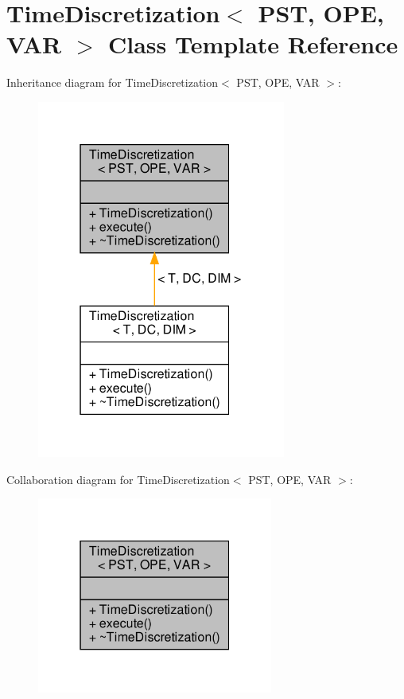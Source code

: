 \hypertarget{classTimeDiscretization}{}\section{Time\+Discretization$<$ P\+ST, O\+PE, V\+AR $>$ Class Template Reference}
\label{classTimeDiscretization}


Inheritance diagram for Time\+Discretization$<$ P\+ST, O\+PE, V\+AR $>$\+:\nopagebreak
\begin{figure}[H]
\begin{center}
\leavevmode
\includegraphics[width=232pt]{classTimeDiscretization__inherit__graph}
\end{center}
\end{figure}


Collaboration diagram for Time\+Discretization$<$ P\+ST, O\+PE, V\+AR $>$\+:\nopagebreak
\begin{figure}[H]
\begin{center}
\leavevmode
\includegraphics[width=220pt]{classTimeDiscretization__coll__graph}
\end{center}
\end{figure}
